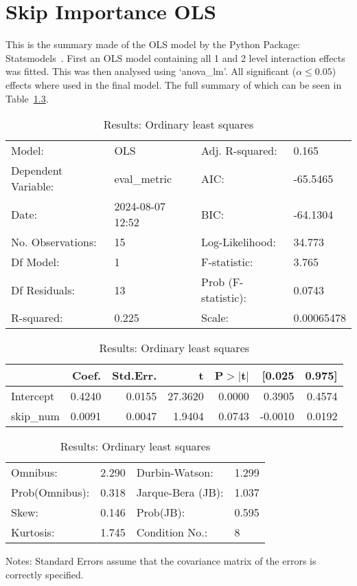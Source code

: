\chapter{Skip Importance OLS}
\label{appendix:skip_importance_full}
This is the summary made of the OLS model by the Python Package: Statsmodels~\cite{josef_perktold_2024_10984387}. First an OLS model containing all 1 and 2 level interaction effects was fitted. This was then analysed using `anova\_lm'. All significant ($\alpha\le0.05$) effects where used in the final model. The full summary of which can be seen in Table~\ref{tab:skip_importance_full_ols}.

\begin{table}[ht]
\caption{Results: Ordinary least squares}
\label{tab:skip_importance_full_ols}
\begin{center}
\begin{tabular}{llll}
\hline
Model:              & OLS              & Adj. R-squared:     & 0.165       \\
Dependent Variable: & eval\_metric     & AIC:                & -65.5465    \\
Date:               & 2024-08-07 12:52 & BIC:                & -64.1304    \\
No. Observations:   & 15               & Log-Likelihood:     & 34.773      \\
Df Model:           & 1                & F-statistic:        & 3.765       \\
Df Residuals:       & 13               & Prob (F-statistic): & 0.0743      \\
R-squared:          & 0.225            & Scale:              & 0.00065478  \\
\hline
\end{tabular}
\end{center}

\begin{center}
\begin{tabular}{lrrrrrr}
\hline
          &  Coef. & Std.Err. &       t & P$> |$t$|$ &  [0.025 & 0.975]  \\
\hline
Intercept & 0.4240 &   0.0155 & 27.3620 &      0.0000 &  0.3905 & 0.4574  \\
skip\_num & 0.0091 &   0.0047 &  1.9404 &      0.0743 & -0.0010 & 0.0192  \\
\hline
\end{tabular}
\end{center}

\begin{center}
\begin{tabular}{llll}
\hline
Omnibus:       & 2.290 & Durbin-Watson:    & 1.299  \\
Prob(Omnibus): & 0.318 & Jarque-Bera (JB): & 1.037  \\
Skew:          & 0.146 & Prob(JB):         & 0.595  \\
Kurtosis:      & 1.745 & Condition No.:    & 8      \\
\hline
\end{tabular}
\end{center}
\end{table}
\bigskip
Notes: \newline 
[1] Standard Errors assume that the covariance matrix of the errors is correctly specified.